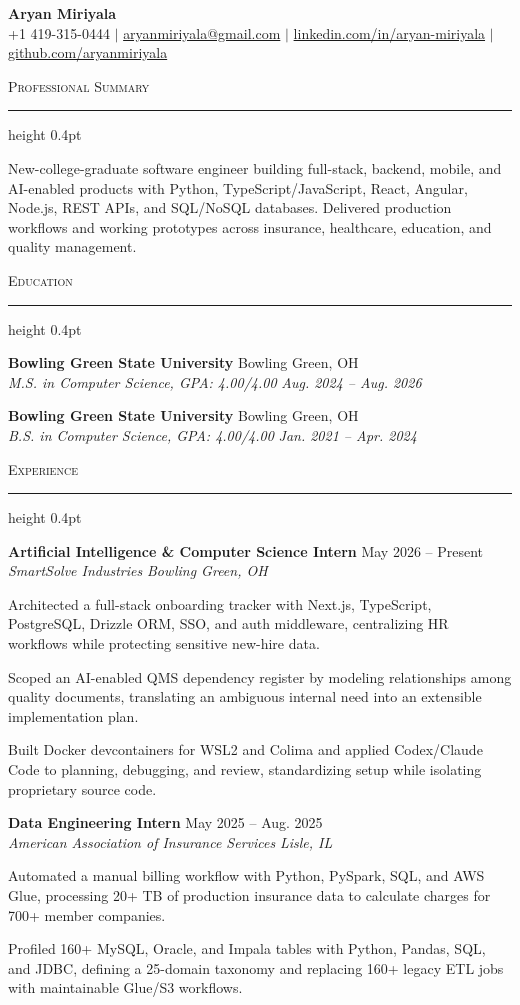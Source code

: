 \documentclass[letterpaper,11pt]{article}
\newcommand{\resumesection}[1]{%
  \par\vspace{2pt}%
  {\large\scshape #1}\par\vspace{2pt}%
  \hrule height 0.4pt\vspace{2pt}%
}
\newcommand{\resumeSubheading}[4]{
  \textbf{#1} \hfill #2\\
  \textit{#3} \hfill \textit{#4}
}
\begin{document}
\begin{center}
  {\LARGE \textbf{Aryan Miriyala}}\\[-1pt]
  \small
  +1 419-315-0444 $|$
  \href{mailto:aryanmiriyala@gmail.com}{aryanmiriyala@gmail.com} $|$
  \href{https://www.linkedin.com/in/aryan-miriyala-7788a21b6/}{linkedin.com/in/aryan-miriyala} $|$
  \href{https://github.com/aryanmiriyala}{github.com/aryanmiriyala}
\end{center}\vspace{-10pt}

\resumesection{Professional Summary}
New-college-graduate software engineer building full-stack, backend, mobile, and AI-enabled products with Python, TypeScript/JavaScript, React, Angular, Node.js, REST APIs, and SQL/NoSQL databases. Delivered production workflows and working prototypes across insurance, healthcare, education, and quality management.

\resumesection{Education}
\resumeSubheading
{Bowling Green State University}{Bowling Green, OH}
{M.S. in Computer Science, GPA: 4.00/4.00}{Aug. 2024 -- Aug. 2026}

\resumeSubheading
{Bowling Green State University}{Bowling Green, OH}
{B.S. in Computer Science, GPA: 4.00/4.00}{Jan. 2021 -- Apr. 2024}

\resumesection{Experience}
\resumeSubheading
{Artificial Intelligence \& Computer Science Intern}{May 2026 -- Present}
{SmartSolve Industries}{Bowling Green, OH}
\begin{tightitemize}
  \item Architected a full-stack onboarding tracker with Next.js, TypeScript, PostgreSQL, Drizzle ORM, SSO, and auth middleware, centralizing HR workflows while protecting sensitive new-hire data.
  \item Scoped an AI-enabled QMS dependency register by modeling relationships among quality documents, translating an ambiguous internal need into an extensible implementation plan.
  \item Built Docker devcontainers for WSL2 and Colima and applied Codex/Claude Code to planning, debugging, and review, standardizing setup while isolating proprietary source code.
\end{tightitemize}

\resumeSubheading
{Data Engineering Intern}{May 2025 -- Aug. 2025}
{American Association of Insurance Services}{Lisle, IL}
\begin{tightitemize}
  \item Automated a manual billing workflow with Python, PySpark, SQL, and AWS Glue, processing 20+ TB of production insurance data to calculate charges for 700+ member companies.
  \item Profiled 160+ MySQL, Oracle, and Impala tables with Python, Pandas, SQL, and JDBC, defining a 25-domain taxonomy and replacing 160+ legacy ETL jobs with maintainable Glue/S3 workflows.
\end{tightitemize}
\end{document}
